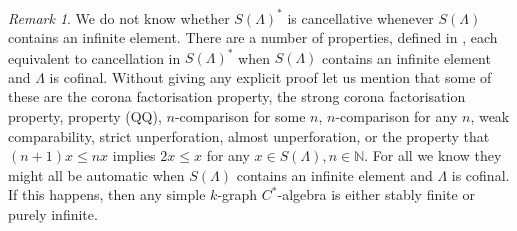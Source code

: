 \documentclass[a4paper, 12pt]{amsart}
\numberwithin{equation}{section}
\newcounter{theorem}
\theoremstyle{remark}
\newtheorem{remark}[theorem]{Remark}
\theoremstyle{definition}
\begin{document}
\begin{remark}
We do not know whether $S(\Lambda)^*$ is cancellative whenever $S(\Lambda)$  contains an
infinite element. There are a number of properties, defined in
\cite{MR2806681, MR2874927}, each equivalent to cancellation in $S(\Lambda)^*$ when
$S(\Lambda)$ contains an infinite element and $\Lambda$ is cofinal. Without giving any
explicit proof let us mention that some of these are the corona factorisation property,
the strong corona factorisation property, property (QQ), $n$-comparison for some $n$,
$n$-comparison for any $n$, weak comparability, strict unperforation, almost
unperforation, or the property that $(n+1)x\leq nx$ implies $2x\leq x$ for any $x\in
S(\Lambda), n\in {\mathbb{N}}$. For all we know they might all be automatic when $S(\Lambda)$
contains an infinite element and $\Lambda$ is cofinal. If this happens, then any simple
$k$-graph $C^*$-algebra is either stably finite or purely infinite.
\end{remark}
\end{document}
